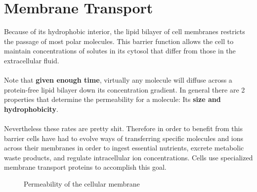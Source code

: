\documentclass[../main.tex]{subfiles}
\begin{document}
\section{Membrane Transport}
Because of its hydrophobic interior, the lipid bilayer of cell membranes restricts the passage of most polar molecules. This barrier function allows the cell to maintain concentrations of solutes in its cytosol that differ from those in the extracellular fluid. \\
\\
Note that \textbf{given enough time}, virtually any molecule will diffuse across a protein-free lipid bilayer down its concentration gradient. In general there are 2 properties that determine the permeability for a molecule: Its \textbf{size and hydrophobicity}. \\
\\
Nevertheless these rates are pretty shit. Therefore in order to benefit from this barrier cells have had to evolve ways of transferring specific molecules and ions across their membranes in order to ingest essential nutrients, excrete metabolic waste products, and regulate intracellular ion concentrations. Cells use specialized membrane transport proteins to accomplish this goal.  
\begin{figure}[H]
	\centering
	\caption{Permeability of the cellular membrane}
\end{figure}
\end{document}
